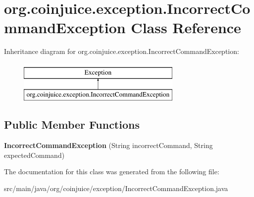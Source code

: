 \hypertarget{classorg_1_1coinjuice_1_1exception_1_1_incorrect_command_exception}{\section{org.\-coinjuice.\-exception.\-Incorrect\-Command\-Exception Class Reference}
\label{classorg_1_1coinjuice_1_1exception_1_1_incorrect_command_exception}
}
Inheritance diagram for org.\-coinjuice.\-exception.\-Incorrect\-Command\-Exception\-:\begin{figure}[H]
\begin{center}
\leavevmode
\includegraphics[height=2.000000cm]{classorg_1_1coinjuice_1_1exception_1_1_incorrect_command_exception}
\end{center}
\end{figure}
\subsection*{Public Member Functions}
\begin{DoxyCompactItemize}
\item 
\hypertarget{classorg_1_1coinjuice_1_1exception_1_1_incorrect_command_exception_a6c9ce38f09b4f6e1af2bb75d4f84ab4c}{{\bfseries Incorrect\-Command\-Exception} (String incorrect\-Command, String expected\-Command)}\label{classorg_1_1coinjuice_1_1exception_1_1_incorrect_command_exception_a6c9ce38f09b4f6e1af2bb75d4f84ab4c}

\end{DoxyCompactItemize}


The documentation for this class was generated from the following file\-:\begin{DoxyCompactItemize}
\item 
src/main/java/org/coinjuice/exception/Incorrect\-Command\-Exception.\-java\end{DoxyCompactItemize}
